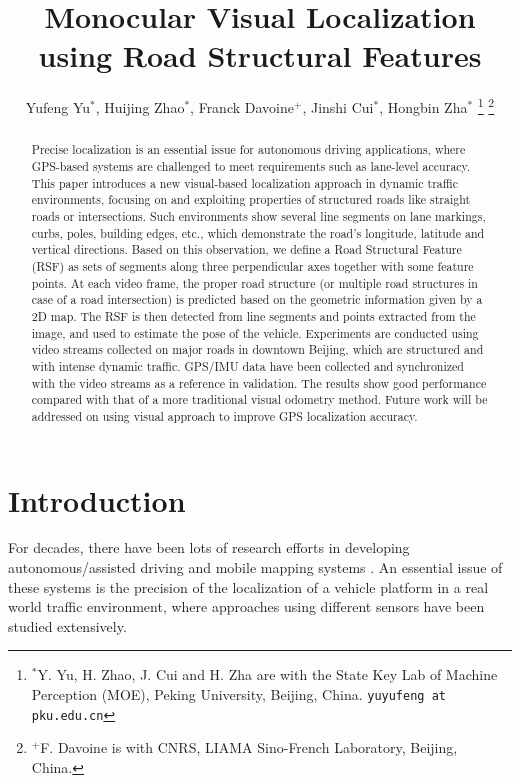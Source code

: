 \documentclass[letterpaper, 10 pt, conference]{ieeeconf}  %
\title{\LARGE \bf
Monocular Visual Localization using Road Structural Features
}
\author{Yufeng Yu$^{*}$, Huijing Zhao$^{*}$, Franck Davoine$^{+}$, Jinshi Cui$^{*}$, Hongbin Zha$^{*}$
\thanks{$^{*}$Y. Yu, H. Zhao, J. Cui and H. Zha are with the State Key Lab of Machine Perception (MOE), Peking University, Beijing, China. {\tt\small yuyufeng at pku.edu.cn}}
\thanks{$^{+}$F. Davoine is with CNRS, LIAMA Sino-French Laboratory, Beijing, China.}%
}
\begin{document}
\maketitle
\thispagestyle{empty}
\pagestyle{empty}


\begin{abstract}
Precise localization is an essential issue for autonomous driving applications, where GPS-based systems are challenged to meet requirements such as lane-level accuracy. This paper introduces a new visual-based localization approach in dynamic traffic environments, focusing on and exploiting properties of structured roads like straight roads or intersections. Such environments show several line segments on lane markings, curbs, poles, building edges, etc., which demonstrate the road's longitude, latitude and vertical directions. Based on this observation, we define a Road Structural Feature (RSF) as sets of segments along three perpendicular axes together with some feature points. At each video frame, the proper road structure (or multiple road structures in case of a road intersection) is predicted based on the geometric information given by a 2D map. The RSF is then detected from line segments and points extracted from the image, and used to estimate the pose of the vehicle. Experiments are conducted using video streams collected on major roads in downtown Beijing, which are structured and with intense dynamic traffic. GPS/IMU data have been collected and synchronized with the video streams as a reference in validation. The results show good performance compared with that of a more traditional visual odometry method. Future work will be addressed on using visual approach to improve GPS localization accuracy.
\end{abstract}


\section{Introduction}
\label{sec_introduction}

For decades, there have been lots of research efforts in developing autonomous/assisted driving and mobile mapping systems \cite{urmson2008autonomous}. An essential issue of these systems is the precision of the localization of a vehicle platform in a real world traffic environment, where approaches using different sensors have been studied extensively.
\end{document}
